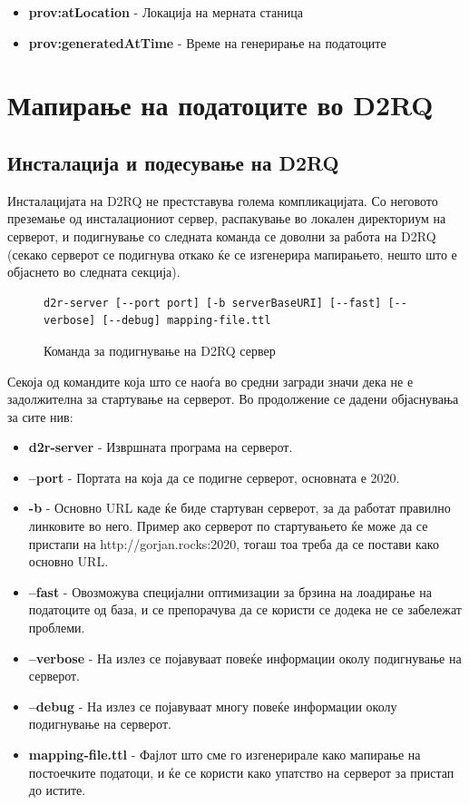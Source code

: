 \documentclass{uvamscse}
\begin{document}
\begin{itemize}
\item \textbf{prov:atLocation} - Локација на мерната станица
\item \textbf{prov:generatedAtTime} - Време на генерирање на податоците
\end{itemize}

\chapter{Мапирање на податоците во D2RQ}

\section{Инсталација и подесување на D2RQ}

Инсталацијата на D2RQ не престставува голема компликацијата. Со неговото преземање од инсталациониот сервер, распакување во локален директориум на серверот, и подигнување со следната команда се доволни за работа на D2RQ (секако серверот се подигнува откако ќе се изгенерира мапирањето, нешто што е објаснето во следната секција).

\begin{figure}[H]
\centering
\begin{snippet}
\begin{verbatim}
d2r-server [--port port] [-b serverBaseURI] [--fast] [--verbose] [--debug] mapping-file.ttl
\end{verbatim}
\end{snippet}
\caption{Команда за подигнување на D2RQ сервер}
\label{fig:d2rqrun}
\end{figure}

Секоја од командите која што се наоѓа во средни загради значи дека не е задолжителна за стартување на серверот. Во продолжение се дадени објаснувања за сите нив:

\begin{itemize}
\item \textbf{d2r-server} - Извршната програма на серверот.
\item \textbf{--port} - Портата на која да се подигне серверот, основната е 2020.
\item \textbf{-b} - Основно URL каде ќе биде стартуван серверот, за да работат правилно линковите во него. Пример ако серверот по стартувањето ќе може да се пристапи на http://gorjan.rocks:2020, тогаш тоа треба да се постави како основно URL.
\item \textbf{--fast} - Овозможува специјални оптимизации за брзина на лоадирање на податоците од база, и се препорачува да се користи се додека не се забележат проблеми.
\item \textbf{--verbose} - На излез се појавуваат повеќе информации околу подигнување на серверот.
\item \textbf{--debug} - На излез се појавуваат многу повеќе информации околу подигнување на серверот. 
\item \textbf{mapping-file.ttl} - Фајлот што сме го изгенерирале како мапирање на постоечките податоци, и ќе се користи како упатство на серверот за пристап до истите.
\end{itemize}
\end{document}
